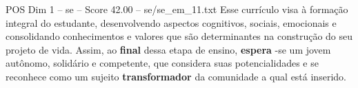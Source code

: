 \begin{textsample}{POS Dim 1 – se – Score 42.00 – se/se\_em\_11.txt}
Esse currículo visa à formação integral do estudante, desenvolvendo aspectos cognitivos, sociais, emocionais e consolidando conhecimentos e valores que são determinantes na construção do seu projeto de vida.
Assim, ao \textbf{final} dessa etapa de ensino, \textbf{espera} -se um jovem autônomo, solidário e competente, que considera suas potencialidades e se reconhece como um sujeito \textbf{transformador} da comunidade a qual está inserido.

\end{textsample}
